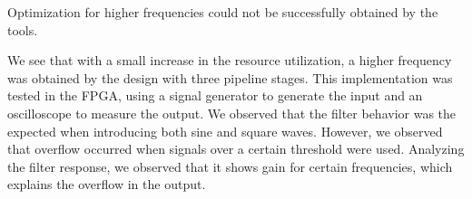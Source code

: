 \documentclass[12pt]{article}
\begin{document}
Optimization for higher frequencies could not be successfully obtained by the tools.

We see that with a small increase in the resource utilization, a higher frequency was obtained by
the design with three pipeline stages. This implementation was tested in the FPGA, using a signal
generator to generate the input and an oscilloscope to measure the output. We observed that the
filter behavior was the expected when introducing both sine and square waves. However, we observed
that overflow occurred when signals over a certain threshold were used. Analyzing the filter
response, we observed that it shows gain for certain frequencies, which explains the overflow in the
output.

 
\end{document}
